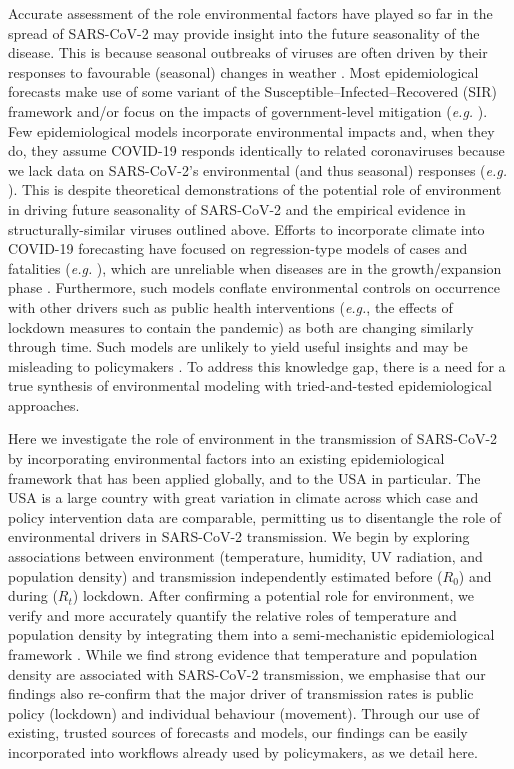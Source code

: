 \documentclass[12pt,english,a4paper]{article}
\newcommand{\virus}{SARS-CoV-2\xspace}
\newcommand{\disease}{COVID-19\xspace}
\newcommand{\RO}{$R_0$\xspace}
\begin{document}
Accurate assessment of the role environmental factors have played so far in the spread of \virus may provide insight into the future seasonality of the disease. This is because seasonal outbreaks of viruses are often driven by their responses to favourable (seasonal) changes in weather \cite{NationalResearchCouncil2001}.
Most epidemiological forecasts make use of some variant of the Susceptible--Infected--Recovered (SIR) framework and/or focus on the impacts of government-level mitigation (\emph{e.g.} \citet{Walker2020}).
Few epidemiological models incorporate environmental impacts and, when they do, they assume \disease responds identically to related coronaviruses because we lack data on \virus's environmental (and thus seasonal) responses (\emph{e.g.} \citet{Baker2020}).
This is despite theoretical demonstrations of the potential role of environment in driving future seasonality of SARS-CoV-2\cite{Ma2020, Wang2020} and the empirical evidence in structurally-similar viruses outlined above. 
Efforts to incorporate climate into \disease forecasting have focused on regression-type models of cases and fatalities (\emph{e.g.} \citet{Araujo2020}), which are unreliable when diseases are in the growth/expansion phase \cite{Chipperfield2020}. 
Furthermore, such models conflate environmental controls on occurrence with other drivers such as public health interventions (\emph{e.g.}, the effects of lockdown measures to contain the pandemic)\cite{Chipperfield2020} as both are changing similarly through time.
Such models are unlikely to yield useful insights and may be misleading to policymakers \cite{Carlson2020}.
To address this knowledge gap, there is a need for a true synthesis of environmental modeling with tried-and-tested epidemiological approaches.



Here we investigate the role of environment in the transmission of \virus by incorporating environmental factors into an existing epidemiological framework that has been applied globally\cite{Flaxman2020a,Mellan2020}, and to the USA in particular\cite{Unwin2020a}. The USA is a large country with great variation in climate across which case and policy intervention data are comparable, permitting us to disentangle the role of environmental drivers in \virus transmission.
We begin by exploring associations between environment (temperature, humidity, UV radiation, and population density) and transmission independently estimated before (\RO) and during ($R_t$) lockdown. After confirming a potential role for environment, we verify and more accurately quantify the relative roles of temperature and population density by integrating them into a semi-mechanistic epidemiological framework \cite{Unwin2020a}.
While we find strong evidence that temperature and population density are associated with \virus transmission, we emphasise that our findings also re-confirm that the major driver of transmission rates is public policy (lockdown) and individual behaviour (movement). Through our use of existing, trusted sources of forecasts and models, our findings can be easily incorporated into workflows already used by policymakers, as we detail here.
\end{document}
